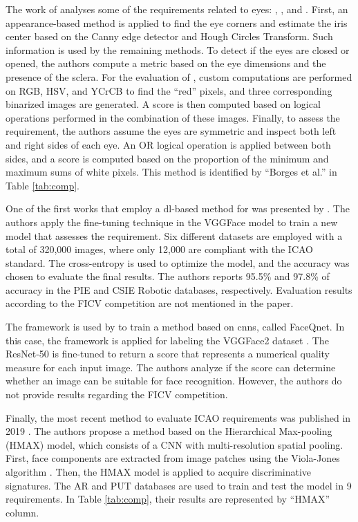 The work of \citet{borges2016analysis} analyses some of the requirements related to eyes: \eyesclosed, \redeyes, and \lookingaway. First, an appearance-based method is applied to find the eye corners and estimate the iris center based on the Canny edge detector and Hough Circles Transform. Such information is used by the remaining methods. To detect if the eyes are closed or opened, the authors compute a metric based on the eye dimensions and the presence of the sclera. For the evaluation of \redeyes, custom computations are performed on RGB, HSV, and YCrCB to find the ``red'' pixels, and three corresponding binarized images are generated. A score is then computed based on logical operations performed in the combination of these images. Finally, to assess the \lookingaway requirement, the authors assume the eyes are symmetric and inspect both left and right sides of each eye. An OR logical operation is applied between both sides, and a score is computed based on the proportion of the minimum and maximum sums of white pixels. This method is identified by ``Borges et al.'' in Table \ref{tab:comp}.

One of the first works that employ a \acl{dl}-based method for \icao was presented by \cite{ahmadvand2018estimating}. The authors apply the fine-tuning technique in the VGGFace model \citep{simonyan2014very} to train a new model that assesses the \rollpitchyaw requirement. Six different datasets are employed with a total of 320,000 images, where only 12,000 are compliant with the ICAO standard. The cross-entropy is used to optimize the model, and the accuracy was chosen to evaluate the final results. The authors reports 95.5\% and 97.8\% of accuracy in the PIE \citep{sim2002cmu} and CSIE Robotic \citep{csie2006database} databases, respectively. Evaluation results according to the FICV competition are not mentioned in the paper.

The \biolabicao framework is used by \cite{hernandez2019faceqnet} to train a method based on \aclp{cnn}, called FaceQnet. In this case, the framework is applied for labeling the VGGFace2 dataset \citep{cao2018vggface2}. The ResNet-50 \citep{he2016deep} is fine-tuned to return a score that represents a numerical quality measure for each input image. The authors analyze if the score can determine whether an image can be suitable for face recognition. However, the authors do not provide results regarding the FICV competition.

Finally, the most recent method to evaluate ICAO requirements was published in 2019 \citep{nourbakhshfacial}. The authors propose a method based on the Hierarchical Max-pooling (HMAX) model, which consists of a CNN with multi-resolution spatial pooling. First, face components are extracted from image patches using the Viola-Jones algorithm \citep{viola2001rapid}. Then, the HMAX model is applied to acquire discriminative signatures. The AR \citep{martinez1998ar} and PUT \citep{kasinski2008put} databases are used to train and test the model in 9 requirements. In Table \ref{tab:comp}, their results are represented by ``HMAX'' column.

